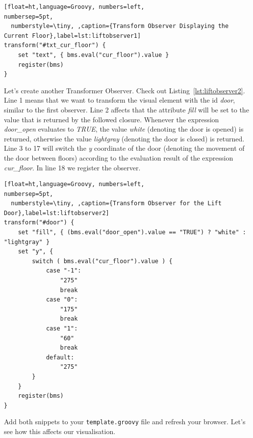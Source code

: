 \begin{lstlisting}[float=ht,language=Groovy, numbers=left,                   numbersep=5pt,            
  numberstyle=\tiny, ,caption={Transform Observer Displaying the Current Floor},label=lst:liftobserver1]
transform("#txt_cur_floor") {
    set "text", { bms.eval("cur_floor").value }
    register(bms)
}
\end{lstlisting}

Let's create another Transformer Observer.
Check out Listing~\ref{lst:liftobserver2}.
Line 1 means that we want to transform the visual element with the id \textit{door}, similar to the first observer.
Line 2 affects that the attribute \textit{fill} will be set to the value that is returned by the followed closure.
Whenever the expression \textit{door\_open} evaluates to \textit{TRUE}, the value \textit{white} (denoting the door is opened) is returned, otherwise the value \textit{lightgray} (denoting the door is closed) is returned.
Line 3 to 17 will switch the \textit{y} coordinate of the door (denoting the movement of the door between floors) according to the evaluation result of the expression \textit{cur\_floor}.
In line 18 we register the observer.

\begin{lstlisting}[float=ht,language=Groovy, numbers=left,                   numbersep=5pt,            
  numberstyle=\tiny, ,caption={Transform Observer for the Lift Door},label=lst:liftobserver2]
transform("#door") {
    set "fill", { (bms.eval("door_open").value == "TRUE") ? "white" : "lightgray" }
    set "y", {
        switch ( bms.eval("cur_floor").value ) {
            case "-1":
                "275"
                break
            case "0":
                "175"
                break
            case "1":
                "60"
                break
            default:
                "275"
        }
    }
    register(bms)
}
\end{lstlisting}

Add both snippets to your \texttt{template.groovy} file and refresh your browser.
Let's see how this affects our visualisation.

